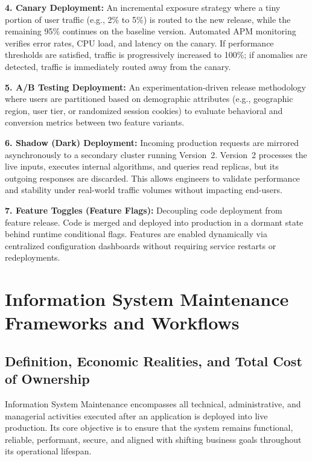 \documentclass[11pt,a4paper]{article}
\begin{document}
\textbf{4. Canary Deployment:} An incremental exposure strategy where a tiny portion of user traffic (e.g., 2\% to 5\%) is routed to the new release, while the remaining 95\% continues on the baseline version. Automated APM monitoring verifies error rates, CPU load, and latency on the canary. If performance thresholds are satisfied, traffic is progressively increased to 100\%; if anomalies are detected, traffic is immediately routed away from the canary.

\textbf{5. A/B Testing Deployment:} An experimentation-driven release methodology where users are partitioned based on demographic attributes (e.g., geographic region, user tier, or randomized session cookies) to evaluate behavioral and conversion metrics between two feature variants.

\textbf{6. Shadow (Dark) Deployment:} Incoming production requests are mirrored asynchronously to a secondary cluster running Version~2. Version~2 processes the live inputs, executes internal algorithms, and queries read replicas, but its outgoing responses are discarded. This allows engineers to validate performance and stability under real-world traffic volumes without impacting end-users.

\textbf{7. Feature Toggles (Feature Flags):} Decoupling code deployment from feature release. Code is merged and deployed into production in a dormant state behind runtime conditional flags. Features are enabled dynamically via centralized configuration dashboards without requiring service restarts or redeployments.

\section[System Maintenance Frameworks]{Information System Maintenance Frameworks and Workflows}
\label{sec:system_maintenance}

\subsection{Definition, Economic Realities, and Total Cost of Ownership}
Information System Maintenance encompasses all technical, administrative, and managerial activities executed after an application is deployed into live production. Its core objective is to ensure that the system remains functional, reliable, performant, secure, and aligned with shifting business goals throughout its operational lifespan.
\end{document}
